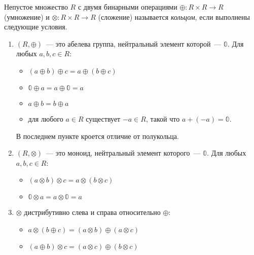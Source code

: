 \begin{definition}[Кольцо]
    Непустое множество $R$ с двумя бинарными операциями $\oplus: R \times R \to R$ (умножение) и $\otimes: R \times R \to R$ (сложение) называется \emph{кольцом}, если выполнены следующие условия.
    \begin{enumerate}
        \item $(R, \oplus)$~--- это абелева группа, нейтральный элемент которой~--- $\Bbbzero$.
              Для любых $a, b, c \in R$:
              \begin{itemize}
                  \item $(a \oplus b) \oplus c = a \oplus (b \oplus c)$
                  \item $\Bbbzero \oplus a = a \oplus \Bbbzero = a$
                  \item $a \oplus b = b \oplus a$
                  \item для любого $a \in R$ существует $-a \in  R$, такой что $a + (-a) = \Bbbzero$.
              \end{itemize}
              В последнем пункте кроется отличие от полукольца.
        \item $(R, \otimes)$~--- это моноид, нейтральный элемент которого~--- $\Bbbzero$.
              Для любых $a, b, c \in R$:
              \begin{itemize}
                  \item $(a \otimes b) \otimes c = a \otimes (b \otimes c)$
                  \item $\Bbbzero \otimes a = a \otimes \Bbbzero = a$
              \end{itemize}
        \item $\otimes$ дистрибутивно слева и справа относительно $\oplus$:
              \begin{itemize}
                  \item $a \otimes (b \oplus c) = (a \otimes b) \oplus (a \otimes c)$
                  \item $(a \oplus b) \otimes c = (a \otimes c) \oplus (b \otimes c)$
              \end{itemize}
    \end{enumerate}
\end{definition}

